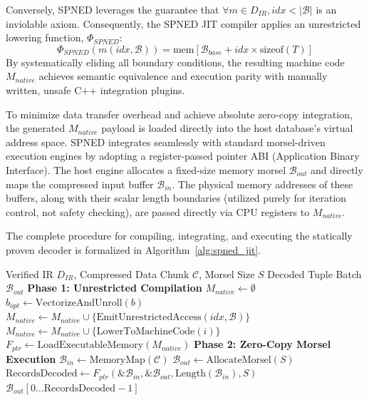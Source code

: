 \documentclass[onecolumn]{IEEEtran}
\numberwithin{equation}{section}
\theoremstyle{definition}
\theoremstyle{remark}
\begin{document}
Conversely, SPNED leverages the guarantee that $\forall m \in D_{IR}, idx < |\mathcal{B}|$ is an inviolable axiom. Consequently, the SPNED JIT compiler applies an unrestricted lowering function, $\Phi_{SPNED}$:
\begin{equation}
    \Phi_{SPNED}(m(idx, \mathcal{B})) = \text{mem}[\mathcal{B}_{base} + idx \times \text{sizeof}(T)]
\end{equation}
By systematically eliding all boundary conditions, the resulting machine code $M_{native}$ achieves semantic equivalence and execution parity with manually written, unsafe C++ integration plugins.

To minimize data transfer overhead and achieve absolute zero-copy integration, the generated $M_{native}$ payload is loaded directly into the host database's virtual address space. SPNED integrates seamlessly with standard morsel-driven execution engines \cite{leis2014morsel, neumann2020umbra} by adopting a register-passed pointer ABI (Application Binary Interface). The host engine allocates a fixed-size memory morsel $\mathcal{B}_{out}$ and directly maps the compressed input buffer $\mathcal{B}_{in}$. The physical memory addresses of these buffers, along with their scalar length boundaries (utilized purely for iteration control, not safety checking), are passed directly via CPU registers to $M_{native}$. 

The complete procedure for compiling, integrating, and executing the statically proven decoder is formalized in Algorithm~\ref{alg:spned_jit}.

\begin{algorithm}[H]
\caption{SPNED Native Compilation and Zero-Copy Execution}
\label{alg:spned_jit}
\begin{algorithmic}[1]
\Require Verified IR $D_{IR}$, Compressed Data Chunk $\mathcal{C}$, Morsel Size $S$
\Ensure Decoded Tuple Batch $\mathcal{B}_{out}$
\State \textbf{Phase 1: Unrestricted Compilation}
\State $M_{native} \gets \emptyset$
    \State $b_{opt} \gets \text{VectorizeAndUnroll}(b)$ 
            \State $M_{native} \gets M_{native} \cup \{ \text{EmitUnrestrictedAccess}(idx, \mathcal{B}) \}$
        \Else
            \State $M_{native} \gets M_{native} \cup \{ \text{LowerToMachineCode}(i) \}$
        \EndIf
    \EndFor
\EndFor
\State $F_{ptr} \gets \text{LoadExecutableMemory}(M_{native})$ 
\State
\State \textbf{Phase 2: Zero-Copy Morsel Execution}
\State $\mathcal{B}_{in} \gets \text{MemoryMap}(\mathcal{C})$
\State $\mathcal{B}_{out} \gets \text{AllocateMorsel}(S)$ 
\State
\State {}
\State $\text{RecordsDecoded} \gets F_{ptr}(\&\mathcal{B}_{in}, \&\mathcal{B}_{out}, \text{Length}(\mathcal{B}_{in}), S)$
\State
\State \Return $\mathcal{B}_{out}[0 \dots \text{RecordsDecoded} - 1]$
\end{algorithmic}
\end{algorithm}
\end{document}
